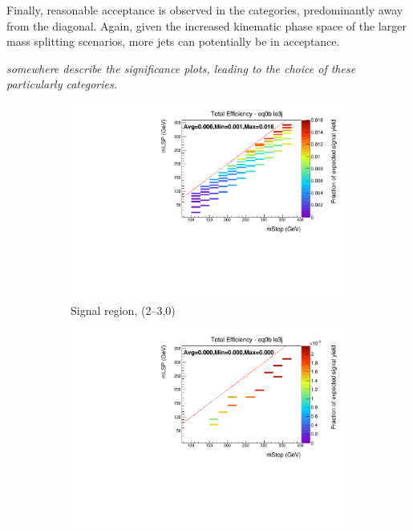 Finally, reasonable acceptance is observed in the \njhigh categories, 
predominantly away from the diagonal. Again, given the increased kinematic phase
space of the larger mass splitting scenarios, more jets can potentially be in 
acceptance.

\emph{somewhere describe the significance plots, leading to the choice of these 
particularly categories.}

\begin{figure}[ht!]
  \centering
  \begin{subfigure}[b]{0.47\textwidth}
    \includegraphics[width=\textwidth]{Figs/sms/t2cc/v24/T2cc_v24_had_eff_maps_eq0b_le3j_SITV.pdf}
    \caption{Signal region, (2--3,0)}
    \label{fig:t2cc_sig_eff_le3j_0b}
  \end{subfigure}
  \begin{subfigure}[b]{0.47\textwidth}
    \includegraphics[width=\textwidth]{Figs/sms/t2cc/v24/T2cc_v24_muon_eff_maps_eq0b_le3j_SITV.pdf}

\end{subfigure}
\end{figure}
